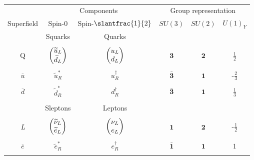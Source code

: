\begin{table}
  \begin{tabular}{cccccc}
    \toprule
                    & \multicolumn{2}{c}{Components}                  & \multicolumn{3}{c}{Group representation} \\ \cmidrule(r){2-3}\cmidrule(l){4-6}
    Superfield      & Spin-0                                          & Spin-$\slantfrac{1}{2}$                                                        & $SU(3)$            & $SU(2)$      & $U(1)_Y$\\\midrule
                    & Squarks                                         & Quarks                                                                         &                    &              & \\ \cmidrule(r){2-3}\\
    Q               & $\begin{pmatrix} \widetilde{u}_L \\ \widetilde{d}_L\end{pmatrix}$   & $\begin{pmatrix} u_L \\ d_L\end{pmatrix}$                                                          & $\mathbf{3}$       & $\mathbf{2}$ & $\frac{1}{2}$\\\\
    $\overline{u}$  & $\tilde{u}_R^*$                                 & $u_R^\dagger$                                                                  & $\bar{\mathbf{3}}$ & $\mathbf{1}$ & -$\frac{2}{3}$\\\\
    $\overline{d}$  & $\tilde{d}_R^*$                                 & $d_R^\dagger$                                                                  & $\bar{\mathbf{3}}$ & $\mathbf{1}$ & $\frac{1}{3}$\\\\\cmidrule{2-3}
                    & Sleptons                                        & Leptons                                                                        &                    &              & \\ \cmidrule{2-3}\\
    \emph{L}        & $\begin{pmatrix} \widetilde{\nu}_L \\ \widetilde{e}_L\end{pmatrix}$ & $\begin{pmatrix} \nu_L \\ e_L\end{pmatrix}$                                                        & $\mathbf{1}$       & $\mathbf{2}$ & -$\frac{1}{2}$\\\\
    $\overline{e}$  & $\tilde{e}_R^*$                                 & $e_R^\dagger$                                                                  & $\bar{\mathbf{1}}$ & $\mathbf{1}$ & $1$\\\\\cmidrule{2-3}

\end{tabular}
\end{table}
